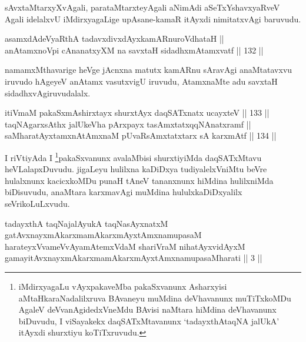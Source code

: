 \begin{artha}
sAvxtaMtarxyXvAgali, parataMtarxteyAgali aNimAdi aSeTxYshavxyaRveV
Agali idelalxvU iMdirxyagaLige upAsane-kamaR itAyxdi nimitatxvAgi baruvudu.
\end{artha}

\begin{shl}
asamxdAdeVyaRthA tadavxdivxdAyxkamARnuroVdhataH || \\
anAtamxnoV\s pi cA\s \s nanatxyXM na savxtaH sidadhxmAtamxvatf \hfill || 132 ||  
\end{shl}

\begin{artha}
namamxMthavarige heVge jAcnxna matutx kamARnu sAravAgi anaMtatavxvu
iruvudo hAgeyeV anAtamx vasutxvigU iruvudu, AtamxnaMte adu savxtaH
sidadhxvAgiruvudalalx.
\end{artha}

\begin{shl}
itiVmaM pakaSxmAshirxtayx shurxtAyx daqSATxnatx ucayxteV \hfill || 133 || \\
taqNAgarxsAthx jalUkeVha pArxpayx tasAmxtatxqqNAnatxramf || \\
saMharatAyxtamxnA\s \s tAmxnaM pUvaRsAmxtatxtarx sA karxmAtf \hfill || 134 ||  
\end{shl}

\begin{artha}
I riVtiyAda I \footnote{iMdirxyagaLu vAyxpakaveMba pakaSxvanunx Asharxyisi
aMtaHkaraNadalilxruva BAvaneyu muMdina deVhavanunx muTiTxkoMDu AgaleV
deVvanAgidedxVneMdu BAvisi naMtara hiMdina deVhavanunx biDuvudu, I
viSayakekx daqSATxMtavanunx `tadayxthAtaqNA jalUkA' itAyxdi shurxtiyu koTiTxruvudu.}pakaSxvanunx avalaMbisi shurxtiyiMda daqSATxMtavu heVLalapxDuvudu. jigaLeyu hulilxna kaDiDxya
tudiyalelxVniMtu beVre hulalxnunx kacicxkoMDu punaH tAneV tananxnunx
hiMdina hulilxniMda biDisuvudu, anaMtara karxmavAgi muMdina
hululxkaDiDxyalilx seVrikoLuLxvudu.
\end{artha}

\begin{kandikeshl}
tadayxthA taqNajalAyukA taqNasAyxnatxM gatAvxnayxmAkarxmamAkarxmAyxtAmxnamupasaM harateyxVvameVvAyamAtemxVdaM shariVraM nihatAyx\s vidAyxM gamayitAvxnayxmAkarxmamAkarxmAyxtAmxnamupasaMharati || 3 ||
\end{kandikeshl}


